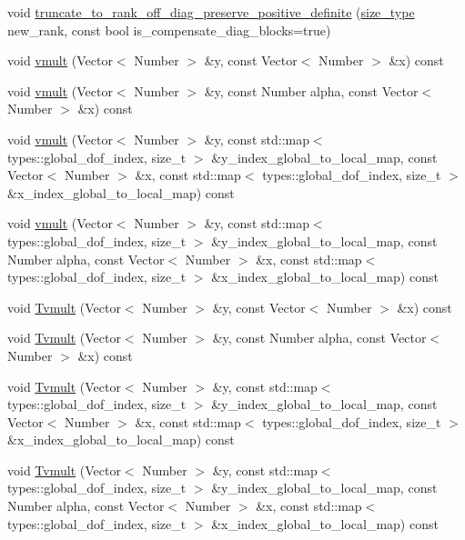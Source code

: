 \begin{DoxyCompactItemize}
\item 
void \hyperlink{classHMatrix_a88546d9ca48a3c1a2a0874545cc4c8df}{truncate\+\_\+to\+\_\+rank\+\_\+off\+\_\+diag\+\_\+preserve\+\_\+positive\+\_\+definite} (\hyperlink{classHMatrix_a5ca8dc549783d38371a01ecd621ecb34}{size\+\_\+type} new\+\_\+rank, const bool is\+\_\+compensate\+\_\+diag\+\_\+blocks=true)
\item 
void \hyperlink{classHMatrix_aa11b5761aba86606effd14b4bdf31912}{vmult} (Vector$<$ Number $>$ \&y, const Vector$<$ Number $>$ \&x) const
\item 
void \hyperlink{classHMatrix_a21ca2a043c8a02a531d5d08437356310}{vmult} (Vector$<$ Number $>$ \&y, const Number alpha, const Vector$<$ Number $>$ \&x) const
\item 
void \hyperlink{classHMatrix_a690927f0810d85d08f0ab2239e405ffe}{vmult} (Vector$<$ Number $>$ \&y, const std\+::map$<$ types\+::global\+\_\+dof\+\_\+index, size\+\_\+t $>$ \&y\+\_\+index\+\_\+global\+\_\+to\+\_\+local\+\_\+map, const Vector$<$ Number $>$ \&x, const std\+::map$<$ types\+::global\+\_\+dof\+\_\+index, size\+\_\+t $>$ \&x\+\_\+index\+\_\+global\+\_\+to\+\_\+local\+\_\+map) const
\item 
void \hyperlink{classHMatrix_ab0a61c4d55a5d132b25589240be5c015}{vmult} (Vector$<$ Number $>$ \&y, const std\+::map$<$ types\+::global\+\_\+dof\+\_\+index, size\+\_\+t $>$ \&y\+\_\+index\+\_\+global\+\_\+to\+\_\+local\+\_\+map, const Number alpha, const Vector$<$ Number $>$ \&x, const std\+::map$<$ types\+::global\+\_\+dof\+\_\+index, size\+\_\+t $>$ \&x\+\_\+index\+\_\+global\+\_\+to\+\_\+local\+\_\+map) const
\item 
void \hyperlink{classHMatrix_a72e5255eb5ce46136d0e2b195c82f016}{Tvmult} (Vector$<$ Number $>$ \&y, const Vector$<$ Number $>$ \&x) const
\item 
void \hyperlink{classHMatrix_a46298efb74444db494068cc3fab73431}{Tvmult} (Vector$<$ Number $>$ \&y, const Number alpha, const Vector$<$ Number $>$ \&x) const
\item 
void \hyperlink{classHMatrix_a52a9fb807eab3f9f0903c03dd637382c}{Tvmult} (Vector$<$ Number $>$ \&y, const std\+::map$<$ types\+::global\+\_\+dof\+\_\+index, size\+\_\+t $>$ \&y\+\_\+index\+\_\+global\+\_\+to\+\_\+local\+\_\+map, const Vector$<$ Number $>$ \&x, const std\+::map$<$ types\+::global\+\_\+dof\+\_\+index, size\+\_\+t $>$ \&x\+\_\+index\+\_\+global\+\_\+to\+\_\+local\+\_\+map) const
\item 
void \hyperlink{classHMatrix_a9ce6e0dd7cfa3dc0fff165d6ed819017}{Tvmult} (Vector$<$ Number $>$ \&y, const std\+::map$<$ types\+::global\+\_\+dof\+\_\+index, size\+\_\+t $>$ \&y\+\_\+index\+\_\+global\+\_\+to\+\_\+local\+\_\+map, const Number alpha, const Vector$<$ Number $>$ \&x, const std\+::map$<$ types\+::global\+\_\+dof\+\_\+index, size\+\_\+t $>$ \&x\+\_\+index\+\_\+global\+\_\+to\+\_\+local\+\_\+map) const

\end{DoxyCompactItemize}

